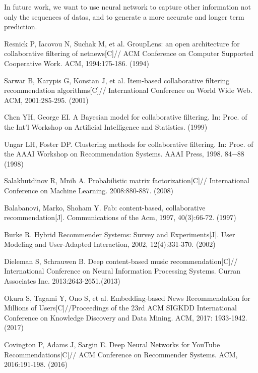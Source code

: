 \documentclass[runningheads]{llncs}
\begin{document}
In future work, we want to use neural network to capture other information not only the sequences of datas, and to generate a more accurate and longer term prediction.

%
%
%
% 
% 
%
\begin{thebibliography}{8}
 Resnick P, Iacovou N, Suchak M, et al. GroupLens: an open architecture for collaborative filtering of netnews[C]// ACM Conference on Computer Supported Cooperative Work. ACM, 1994:175-186. (1994)

 Sarwar B, Karypis G, Konstan J, et al. Item-based collaborative filtering recommendation algorithms[C]// International Conference on World Wide Web. ACM, 2001:285-295. (2001)

 Chen YH, George EI. A Bayesian model for collaborative filtering. In: Proc. of the Int’l Workshop on Artificial Intelligence and Statistics. (1999)

 Ungar LH, Foster DP. Clustering methods for collaborative filtering. In: Proc. of the AAAI Workshop on Recommendation
Systems. AAAI Press, 1998. 84−88 (1998)

 Salakhutdinov R, Mnih A. Probabilistic matrix factorization[C]// International Conference on Machine Learning. 2008:880-887. (2008)

 Balabanovi, Marko, Shoham Y. Fab: content-based, collaborative recommendation[J]. Communications of the Acm, 1997, 40(3):66-72. (1997)

 Burke R. Hybrid Recommender Systems: Survey and Experiments[J]. User Modeling and User-Adapted Interaction, 2002, 12(4):331-370. (2002)

 Dieleman S, Schrauwen B. Deep content-based music recommendation[C]// International Conference on Neural Information Processing Systems. Curran Associates Inc. 2013:2643-2651.(2013)

 Okura S, Tagami Y, Ono S, et al. Embedding-based News Recommendation for Millions of Users[C]//Proceedings of the 23rd ACM SIGKDD International Conference on Knowledge Discovery and Data Mining. ACM, 2017: 1933-1942. (2017)

 Covington P, Adams J, Sargin E. Deep Neural Networks for YouTube Recommendations[C]// ACM Conference on Recommender Systems. ACM, 2016:191-198. (2016)


\end{thebibliography}
\end{document}
